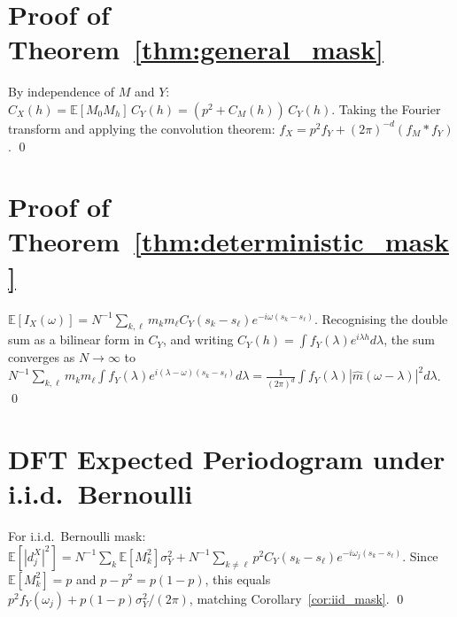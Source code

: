 \documentclass[12pt]{article}
\begin{document}
\appendix
\section{Proof of Theorem~\ref{thm:general_mask}}
\label{app:proof1}

By independence of $M$ and $Y$:
$C_X(h) = \mathbb{E}[M_0 M_h]\,C_Y(h) = (p^2 + C_M(h))\,C_Y(h)$.
Taking the Fourier transform and applying the convolution theorem:
$f_X = p^2 f_Y + (2\pi)^{-d}(f_M \ast f_Y)$.  \qed

\section{Proof of Theorem~\ref{thm:deterministic_mask}}
\label{app:proof2}

$\mathbb{E}[I_X(\omega)]
= N^{-1}\sum_{k,\ell} m_k m_\ell C_Y(s_k-s_\ell) e^{-i\omega(s_k-s_\ell)}$.
Recognising the double sum as a bilinear form in $C_Y$, and writing
$C_Y(h) = \int f_Y(\lambda) e^{i\lambda h} d\lambda$, the sum converges
as $N\to\infty$ to
$N^{-1}\sum_{k,\ell} m_k m_\ell \int f_Y(\lambda) e^{i(\lambda-\omega)(s_k-s_\ell)} d\lambda
= \frac{1}{(2\pi)^d}\int f_Y(\lambda)|\hat{m}(\omega-\lambda)|^2 d\lambda$.  \qed

\section{DFT Expected Periodogram under i.i.d.\ Bernoulli}
\label{app:dft}

For i.i.d.\ Bernoulli mask:
$\mathbb{E}[|d^X_j|^2]
= N^{-1}\sum_k \mathbb{E}[M_k^2]\sigma^2_Y
+ N^{-1}\sum_{k\neq\ell} p^2 C_Y(s_k-s_\ell) e^{-i\omega_j(s_k-s_\ell)}$.
Since $\mathbb{E}[M_k^2] = p$ and $p - p^2 = p(1-p)$, this equals
$p^2 f_Y(\omega_j) + p(1-p)\sigma^2_Y/(2\pi)$, matching
Corollary~\ref{cor:iid_mask}.  \qed
\end{document}
